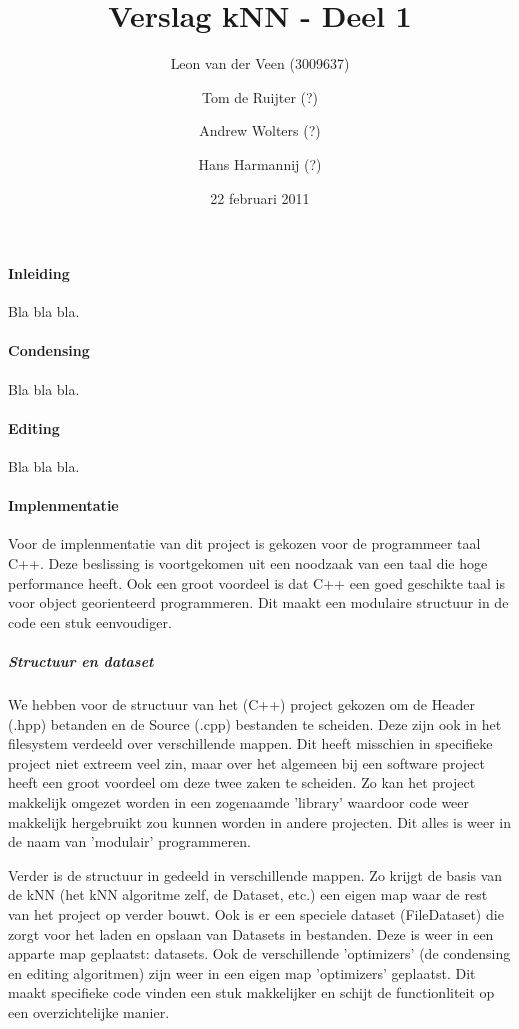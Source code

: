 \documentclass[a4paper,12pt,pdf]{article}
\title{Verslag kNN - Deel 1}
\date{22 februari 2011}
\author{Leon van der Veen (3009637) \and Tom de Ruijter (?) \and Andrew Wolters (?) \and Hans Harmannij (?)}
\begin{document}
	\maketitle
	
	\paragraph{Inleiding}
		Bla bla bla.
		
	\paragraph{Condensing}
		Bla bla bla.
	
	\paragraph{Editing}
		Bla bla bla.
	
	\paragraph{Implenmentatie}
		Voor de implenmentatie van dit project is gekozen voor de programmeer taal C++.
		Deze beslissing is voortgekomen uit een noodzaak van een taal die hoge performance heeft.
		Ook een groot voordeel is dat C++ een goed geschikte taal is voor object georienteerd programmeren.
		Dit maakt een modulaire structuur in de code een stuk eenvoudiger.
		
		\subparagraph{Structuur en dataset}
			We hebben voor de structuur van het (C++) project gekozen om de Header (.hpp) betanden en de Source (.cpp)
			bestanden te scheiden. Deze zijn ook in het filesystem verdeeld over verschillende mappen. Dit heeft misschien
			in specifieke project niet extreem veel zin, maar over het algemeen bij een software project heeft een groot
			voordeel om deze twee zaken te scheiden. Zo kan het project makkelijk omgezet worden in een zogenaamde 'library'
			waardoor code weer makkelijk hergebruikt zou kunnen worden in andere projecten. Dit alles is weer in de naam van
			'modulair' programmeren.
			
			Verder is de structuur in gedeeld in verschillende mappen. Zo krijgt de basis van de kNN (het kNN algoritme zelf, de
			Dataset, etc.) een eigen map waar de rest van het project op verder bouwt. Ook is er een speciele dataset (FileDataset)
			die zorgt voor het laden en opslaan van Datasets in bestanden. Deze is weer in een apparte map geplaatst: datasets.
			Ook de verschillende 'optimizers' (de condensing en editing algoritmen) zijn weer in een eigen map 'optimizers' geplaatst.
			Dit maakt specifieke code vinden een stuk makkelijker en schijt de functionliteit op een overzichtelijke manier.
			
\end{document}
